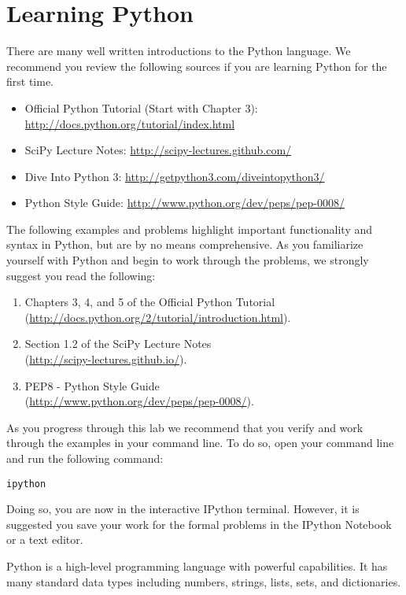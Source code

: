 \section*{Learning Python}
There are many well written introductions to the Python language.
We recommend you review the following sources if you are learning Python for the
first time.

\begin{itemize}
\item Official Python Tutorial (Start with Chapter 3): 
\url{http://docs.python.org/tutorial/index.html} 
\item SciPy Lecture Notes: \url{http://scipy-lectures.github.com/}
\item Dive Into Python 3: \url{http://getpython3.com/diveintopython3/}
\item Python Style Guide: \url{http://www.python.org/dev/peps/pep-0008/}
\end{itemize}

The following examples and problems highlight important functionality
and syntax in Python, but are by no means comprehensive.
As you familiarize yourself with Python and begin to work through the problems,  
we strongly suggest you read the following:
\begin{enumerate}
\item Chapters 3, 4, and 5 of the Official Python Tutorial \\
        (\url{http://docs.python.org/2/tutorial/introduction.html}).
\item Section 1.2 of the SciPy Lecture Notes \\
        (\url{http://scipy-lectures.github.io/}).
\item PEP8 - Python Style Guide \\
        (\url{http://www.python.org/dev/peps/pep-0008/}).
\end{enumerate}


As you progress through this lab we recommend that you verify and work 
through the examples in your command line. 
To do so, open your command line and run the following command: 
\begin{lstlisting}
ipython
\end{lstlisting}
Doing so, you are now in the interactive IPython terminal.
However, it is suggested you save your work for the formal problems in the 
IPython Notebook or a text editor. 

Python is a high-level programming language with powerful capabilities. 
It has many standard data types including numbers, strings, lists, sets, and dictionaries. 

